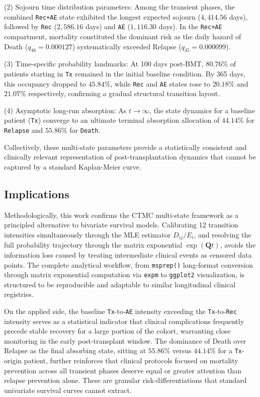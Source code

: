 \documentclass[9pt,a4paper,twocolumn,twoside]{rho-class/rho}
\begin{document}
        \noindent (2) Sojourn time distribution parameters: Among the transient phases, the combined \texttt{Rec+AE} state exhibited the longest expected sojourn ($4,414.56$ days), followed by \texttt{Rec} ($2,586.16$ days) and \texttt{AE} ($1,116.30$ days). In the \texttt{Rec+AE} compartment, mortality constituted the dominant risk as the daily hazard of Death ($q_{46} = 0.000127$) systematically exceeded Relapse ($q_{45} = 0.000099$).

        \noindent (3) Time-specific probability landmarks: At 100 days post-BMT, $80.76\%$ of patients starting in \texttt{Tx} remained in the initial baseline condition. By 365 days, this occupancy dropped to $45.84\%$, while \texttt{Rec} and \texttt{AE} states rose to $20.18\%$ and $21.07\%$ respectively, confirming a gradual structural transition layout. 
        
        \noindent (4) Asymptotic long-run absorption: As $t \to \infty$, the state dynamics for a baseline patient (\texttt{Tx}) converge to an ultimate terminal absorption allocation of $44.14\%$ for \texttt{Relapse} and $55.86\%$ for \texttt{Death}. 

        Collectively, these multi-state parameters provide a statistically consistent and clinically relevant representation of post-transplantation dynamics that cannot be captured by a standard Kaplan-Meier curve.
        
    \subsection{Implications}
        Methodologically, this work confirms the CTMC multi-state framework as a principled alternative to bivariate survival models. Calibrating 12 transition intensities simultaneously through the MLE estimator $D_{ij} / E_i$, and resolving the full probability trajectory through the matrix exponential $\exp(\mathbf{Q}t)$, avoids the information loss caused by treating intermediate clinical events as censored data points. The complete analytical workflow, from \texttt{msprep()} long-format conversion through matrix exponential computation via \texttt{expm} to \texttt{ggplot2} visualization, is structured to be reproducible and adaptable to similar longitudinal clinical registries.

        On the applied side, the baseline \texttt{Tx}-to-\texttt{AE} intensity exceeding the \texttt{Tx}-to-\texttt{Rec} intensity serves as a statistical indicator that clinical complications frequently precede stable recovery for a large portion of the cohort, warranting close monitoring in the early post-transplant window. The dominance of Death over Relapse as the final absorbing state, sitting at $55.86\%$ versus $44.14\%$ for a \texttt{Tx}-origin patient, further reinforces that clinical protocols focused on mortality prevention across all transient phases deserve equal or greater attention than relapse prevention alone. These are granular risk-differentiations that standard univariate survival curves cannot extract. 
        
\end{document}
